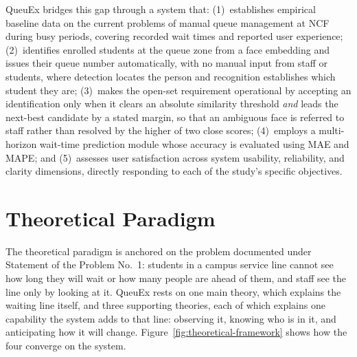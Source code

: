 \documentclass{research}
\newcommand{\sysname}{QueuEx}
\begin{document}
\sysname{} bridges this gap through a system that: (1)~establishes
empirical baseline data on the current problems of manual queue
management at NCF during busy periods, covering recorded wait times and
reported user experience; (2)~identifies enrolled students at the queue
zone from a face embedding and issues their queue number automatically,
with no manual input from staff or students, where detection locates the
person and recognition establishes which student they are; (3)~makes the
open-set requirement operational by accepting an identification only when
it clears an absolute similarity threshold \emph{and} leads the
next-best candidate by a stated margin, so that an ambiguous face is
referred to staff rather than resolved by the higher of two close scores;
(4)~employs a multi-horizon wait-time prediction module whose accuracy is
evaluated using MAE and MAPE; and (5)~assesses user satisfaction across
system usability, reliability, and clarity dimensions, directly
responding to each of the study's specific objectives.

\section{Theoretical Paradigm}
\label{sec:theoretical}

The theoretical paradigm is anchored on the problem documented under
Statement of the Problem No.~1: students in a campus service line cannot
see how long they will wait or how many people are ahead of them, and
staff see the line only by looking at it. \sysname{} rests on one main
theory, which explains the waiting line itself, and three supporting
theories, each of which explains one capability the system adds to that
line: observing it, knowing who is in it, and anticipating how it will
change. Figure~\ref{fig:theoretical-framework} shows how the four
converge on the system.
\end{document}
